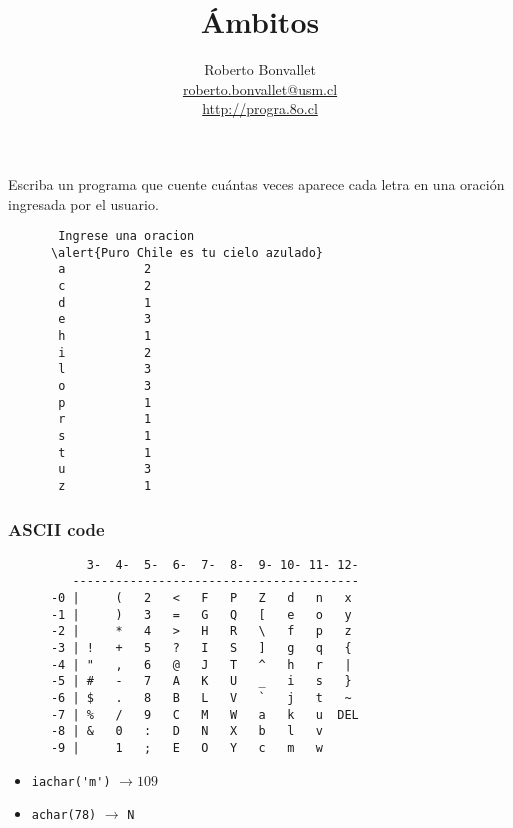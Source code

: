 \documentclass[10pt]{beamer}
\title{Ámbitos}
\author{
  Roberto Bonvallet \\
  \url{roberto.bonvallet@usm.cl} \\
  \url{http://progra.8o.cl}
}
\begin{document}
  \begin{frame}
    \maketitle
  \end{frame}

  \begin{frame}
    
  \end{frame}

  \begin{frame}[fragile]
    Escriba un programa
    que cuente cuántas veces aparece cada letra
    en una oración ingresada por el usuario.
    \begin{Verbatim}
       Ingrese una oracion
      \alert{Puro Chile es tu cielo azulado}
       a           2
       c           2
       d           1
       e           3
       h           1
       i           2
       l           3
       o           3
       p           1
       r           1
       s           1
       t           1
       u           3
       z           1
    \end{Verbatim}

\end{frame}

  \begin{frame}[fragile]
    \frametitle{ASCII code}
    \begin{verbatim}
           3-  4-  5-  6-  7-  8-  9- 10- 11- 12-
         ----------------------------------------
      -0 |     (   2   <   F   P   Z   d   n   x
      -1 |     )   3   =   G   Q   [   e   o   y
      -2 |     *   4   >   H   R   \   f   p   z
      -3 | !   +   5   ?   I   S   ]   g   q   {
      -4 | "   ,   6   @   J   T   ^   h   r   |
      -5 | #   -   7   A   K   U   _   i   s   }
      -6 | $   .   8   B   L   V   `   j   t   ~
      -7 | %   /   9   C   M   W   a   k   u  DEL
      -8 | &   0   :   D   N   X   b   l   v 
      -9 |     1   ;   E   O   Y   c   m   w 
    \end{verbatim}

    \begin{itemize}
      \item \lstinline+iachar('m')+ $\longrightarrow 109$
      \item \lstinline+achar(78)+ $\longrightarrow$ \lstinline+N+
    \end{itemize}

\end{frame}
\end{document}
